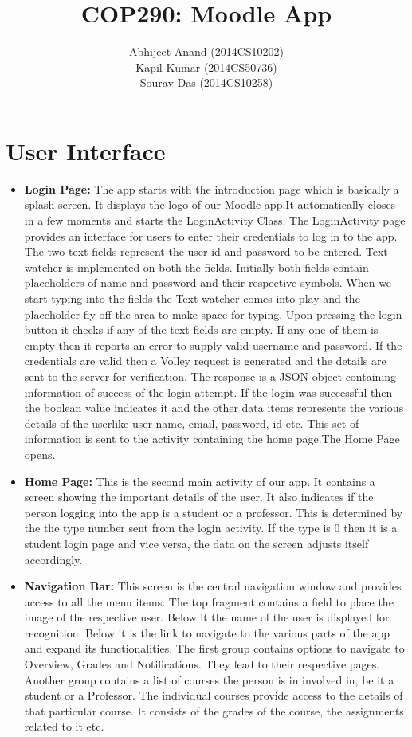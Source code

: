 \documentclass[12pt]{article}
\title{COP290: Moodle App}
\author{Abhijeet Anand (2014CS10202) \\ Kapil Kumar (2014CS50736) \\ Sourav Das (2014CS10258) }
\begin{document}
\maketitle

\section{User Interface}


    
    
    
   
    \begin{itemize}
    \item \textbf{Login Page:} The app starts with the introduction page which is basically a splash screen. It displays the logo of our Moodle app.It automatically closes in a few moments and starts the LoginActivity Class. The LoginActivity page provides an interface for users to enter their credentials to log in to the app. The two text fields represent the user-id and password to be entered. Text-watcher is implemented on both the fields. Initially both fields contain placeholders of name and password and their respective symbols. When we start typing into the fields the Text-watcher comes into play and the placeholder fly off the area to make space for typing. Upon pressing the login button it checks if any of the text fields are empty. If any one of them is empty then it reports an error to supply valid username and password. If the credentials are valid then a Volley request is generated and the details are sent to the server for verification. The response is a JSON object containing information of success of the login attempt. If the login was successful then the boolean value indicates it and the other data items represents the various details of the userlike user name, email, password, id etc. This set of information is sent to the activity containing the home page.The Home Page opens.
    \item \textbf{Home Page:} This is the second main activity of our app. It contains a screen showing the important details of the user. It also indicates if the person logging into the app is a student or a professor. This is determined by the the type number sent from the login activity. If the type is 0 then it is a student login page and vice versa, the data on the screen adjusts itself accordingly.
    \item \textbf{Navigation Bar:} This screen is the central navigation window and provides access to all the menu items. The top fragment contains a field to place the image of the respective user. Below it the name of the user is displayed for recognition. Below it is the link to navigate to the various parts of the app and expand its functionalities. The first group contains options to navigate to Overview, Grades and Notifications. They lead to their respective pages. Another group contains a list of courses the person is in involved in, be it a student or a Professor. The individual courses provide access to the details of that particular course. It consists of the grades of the course, the assignments related to it etc.

\end{itemize}
\end{document}
